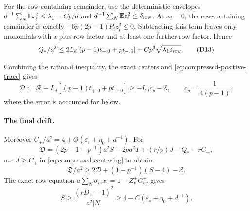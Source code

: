 \documentclass[10pt]{article}
\numberwithin{equation}{section}
\newcommand{\1}{\mathbf1}
\begin{document}
For the row-containing remainder, use the deterministic envelopes
$d^{-1}\sum_N\mathbb Ex_i^2\le\lambda_1=Cp/d$ and
$d^{-1}\sum_N\mathbb Ez_i^2\le\delta_{\rm row}$.
At $x_i=0$, the row-containing remainder is exactly
$-6p(2p-1)P_i z_i^2\le0$. Subtracting this term leaves only monomials
with a plus row factor and at least one further row factor. Hence
\[
 Q_*/a^2\le2L_d[(p-1)t_{+,0}+pt_{-,0}]
                    +Cp^3\sqrt{\lambda_1\delta_{\rm row}}.          \tag{D13}\label{eq:compressed-centering}
\]



Combining the rational inequality, the exact centers and
\eqref{eq:compressed-positive-trace} gives
\[
 \mathcal D:=\mathcal R-L_d[(p-1)t_{+,0}+pt_{-,0}]
      \ge-L_dc_p-\mathcal E,
 \qquad c_p=\frac1{4(p-1)},
 \tag{D12}\label{eq:compressed-residual}
\]
where the error is accounted for below.

\paragraph{The final drift.}
Moreover $C_+/a^2=4+O(\varepsilon_s+\eta_0+d^{-1})$.
For
\[
 \mathfrak D=(2p-1-p^{-1})a^2S-2pa^2T+(r/p)J-Q_*-rC_+,
\]
use $J\ge C_+$ in \eqref{eq:compressed-centering} to obtain
\[
 \mathfrak D/a^2\ge2\mathcal D+(1-p^{-1})(S-4)-\mathcal E.
 \tag{D14}\label{eq:compressed-centered-drift}
\]
The exact row equation
$a\sum_N\sigma_{vi}x_i=1-Z_v^+G^+_{vv}$ gives
\[
 S\ge\frac{(rD_+-1)^2}{a^2|N|}
       \ge4-C(\varepsilon_s+\eta_0+d^{-1}).
 \tag{D15}\label{eq:compressed-row-lower}
\]
\end{document}
